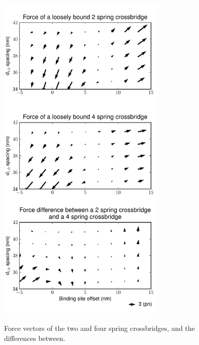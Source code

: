 \documentclass[]{article}
\begin{document}
\begin{figure}[p]
    \begin{center}
    \includegraphics[width=3.2in]{../imgs/Figure4.pdf}
    \label{fig:force}
    \caption{
        Force vectors of the two and four spring crossbridges, and the differences between.}
    \end{center}
\end{figure}





\end{document}
